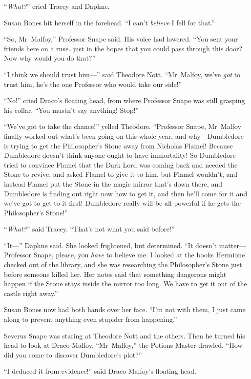 “\emph{What?}” cried Tracey and Daphne.

Susan Bones hit herself in the forehead.
“I can’t \emph{believe} I fell for that.”

“So, Mr~Malfoy,” Professor Snape said. His voice had lowered.
“You sent your friends here on a ruse…just in the hopes that you could pass through this door? Now why would you do that?”

“I think we should trust him—” said Theodore Nott.
“Mr~Malfoy, we’ve \emph{got} to trust him, he’s the one Professor who would take our side!”

“No!” cried Draco’s floating head, from where Professor Snape was still grasping his collar.
“You mustn’t say anything! Stop!”

“We’ve got to take the chance!” yelled Theodore.
“Professor Snape, Mr~Malfoy finally worked out what’s been going on this whole year, and why—Dumbledore is trying to get the Philosopher’s Stone away from Nicholas Flamel! Because Dumbledore doesn’t think anyone ought to have immortality! So Dumbledore tried to convince Flamel that the Dark Lord was coming back and needed the Stone to revive, and asked Flamel to give it to him, but Flamel wouldn’t, and instead Flamel put the Stone in the magic mirror that’s down there, and Dumbledore is finding out right now how to get it, and then he’ll come for it and we’ve got to get to it first! Dumbledore really will be all-powerful if he gets the Philosopher’s Stone!”

“\emph{What?}” said Tracey.
“That’s not what you said before!”

“It—” Daphne said. She looked frightened, but determined.
“It doesn’t matter—Professor Snape, please, you \emph{have} to believe me. I looked at the books Hermione checked out of the library, and she was researching the Philosopher’s Stone just before someone killed her. Her notes said that something dangerous might happen if the Stone stays inside the mirror too long. We have to get it out of the castle right away.”

Susan Bones now had both hands over her face.
“I’m not with them, I just came along to prevent anything even stupider from happening.”

Severus Snape was staring at Theodore Nott and the others. Then he turned his head to look at Draco Malfoy.
“Mr~Malfoy,” the Potions Master drawled.
“How did you come to discover Dumbledore’s plot?”

“I deduced it from evidence!” said Draco Malfoy’s floating head.

